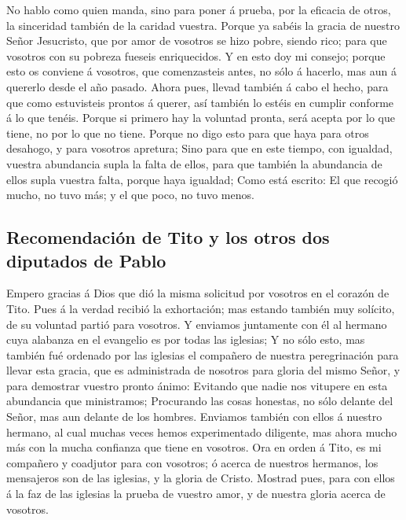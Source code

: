  No hablo como quien manda, sino para poner á prueba, por la
eficacia de otros, la sinceridad también de la caridad vuestra.
 Porque ya sabéis la gracia de nuestro Señor Jesucristo, que
por amor de vosotros se hizo pobre, siendo rico; para que vosotros con
su pobreza fueseis enriquecidos.  Y en esto doy mi consejo;
porque esto os conviene á vosotros, que comenzasteis antes, no sólo á
hacerlo, mas aun á quererlo desde el año pasado.  Ahora
pues, llevad también á cabo el hecho, para que como estuvisteis prontos
á querer, así también lo estéis en cumplir conforme á lo que tenéis.
 Porque si primero hay la voluntad pronta, será acepta por
lo que tiene, no por lo que no tiene.  Porque no digo esto
para que haya para otros desahogo, y para vosotros apretura;
 Sino para que en este tiempo, con igualdad, vuestra
abundancia supla la falta de ellos, para que también la abundancia de
ellos supla vuestra falta, porque haya igualdad;  Como está
escrito: El que recogió mucho, no tuvo más; y el que poco, no tuvo
menos.

\hypertarget{recomendaciuxf3n-de-tito-y-los-otros-dos-diputados-de-pablo}{%
\subsection{Recomendación de Tito y los otros dos diputados de
Pablo}\label{recomendaciuxf3n-de-tito-y-los-otros-dos-diputados-de-pablo}}

 Empero gracias á Dios que dió la misma solicitud por
vosotros en el corazón de Tito.  Pues á la verdad recibió
la exhortación; mas estando también muy solícito, de su voluntad partió
para vosotros.  Y enviamos juntamente con él al hermano
cuya alabanza en el evangelio es por todas las iglesias;  Y
no sólo esto, mas también fué ordenado por las iglesias el compañero de
nuestra peregrinación para llevar esta gracia, que es administrada de
nosotros para gloria del mismo Señor, y para demostrar vuestro pronto
ánimo:  Evitando que nadie nos vitupere en esta abundancia
que ministramos;  Procurando las cosas honestas, no sólo
delante del Señor, mas aun delante de los hombres. 
Enviamos también con ellos á nuestro hermano, al cual muchas veces hemos
experimentado diligente, mas ahora mucho más con la mucha confianza que
tiene en vosotros.  Ora en orden á Tito, es mi compañero y
coadjutor para con vosotros; ó acerca de nuestros hermanos, los
mensajeros son de las iglesias, y la gloria de Cristo. 
Mostrad pues, para con ellos á la faz de las iglesias la prueba de
vuestro amor, y de nuestra gloria acerca de vosotros.

